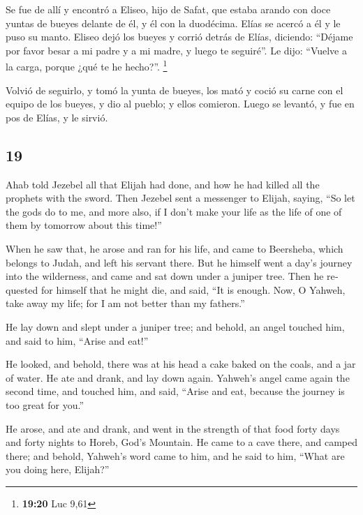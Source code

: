 \begin{paracol}{2}
 Se fue de allí y encontró a Eliseo, hijo de Safat, que
estaba arando con doce yuntas de bueyes delante de él, y él con la
duodécima. Elías se acercó a él y le puso su manto. 
Eliseo dejó los bueyes y corrió detrás de Elías, diciendo: ``Déjame por
favor besar a mi padre y a mi madre, y luego te seguiré''. Le dijo:
``Vuelve a la carga, porque ¿qué te he hecho?''. \footnote{\textbf{19:20}
  Luc 9,61}

 Volvió de seguirlo, y tomó la yunta de bueyes, los mató
y coció su carne con el equipo de los bueyes, y dio al pueblo; y ellos
comieron. Luego se levantó, y fue en pos de Elías, y le sirvió.

\switchcolumn
\begin{otherlanguage}{english}

\hypertarget{section-37}{%
\section{19}\label{section-37}}

 Ahab told Jezebel all that Elijah had done, and how he
had killed all the prophets with the sword.  Then Jezebel
sent a messenger to Elijah, saying, ``So let the gods do to me, and more
also, if I don't make your life as the life of one of them by tomorrow
about this time!''

 When he saw that, he arose and ran for his life, and came
to Beersheba, which belongs to Judah, and left his servant there.
 But he himself went a day's journey into the wilderness,
and came and sat down under a juniper tree. Then he requested for
himself that he might die, and said, ``It is enough. Now, O Yahweh, take
away my life; for I am not better than my fathers.''

 He lay down and slept under a juniper tree; and behold,
an angel touched him, and said to him, ``Arise and eat!''

 He looked, and behold, there was at his head a cake baked
on the coals, and a jar of water. He ate and drank, and lay down again.
 Yahweh's angel came again the second time, and touched
him, and said, ``Arise and eat, because the journey is too great for
you.''

 He arose, and ate and drank, and went in the strength of
that food forty days and forty nights to Horeb, God's Mountain.
 He came to a cave there, and camped there; and behold,
Yahweh's word came to him, and he said to him, ``What are you doing
here, Elijah?''


\end{otherlanguage}
\end{paracol}
